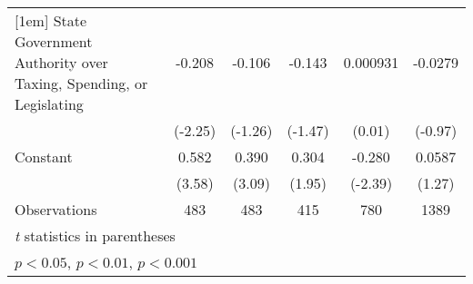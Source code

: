 {\begin{tabular*}{\linewidth}{@{\hskip\tabcolsep\extracolsep\fill}l*{5}{c}}
[1em]
State Government Authority over Taxing, Spending, or Legislating&   -0.208\sym{*}  &   -0.106         &   -0.143         & 0.000931         &  -0.0279         \\
                &  (-2.25)         &  (-1.26)         &  (-1.47)         &   (0.01)         &  (-0.97)         \\
[1em]
Constant        &    0.582\sym{***}&    0.390\sym{**} &    0.304         &   -0.280\sym{*}  &   0.0587         \\
                &   (3.58)         &   (3.09)         &   (1.95)         &  (-2.39)         &   (1.27)         \\
\hline
Observations    &      483         &      483         &      415         &      780         &     1389         \\
\hline\hline
\multicolumn{6}{l}{\footnotesize \textit{t} statistics in parentheses}\\
\multicolumn{6}{l}{\footnotesize \sym{*} \(p<0.05\), \sym{**} \(p<0.01\), \sym{***} \(p<0.001\)}\\
\end{tabular*}
}
